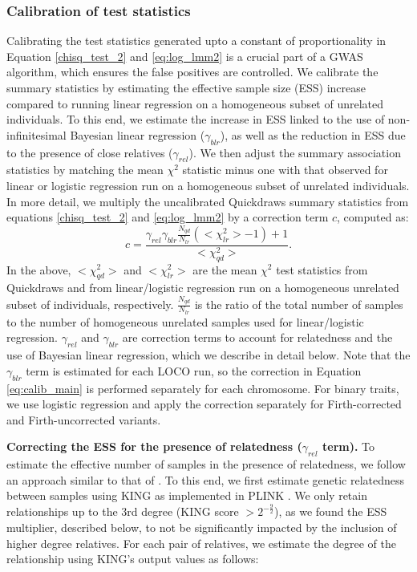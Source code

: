 \subsubsection{Calibration of test statistics}

Calibrating the test statistics generated upto a constant of proportionality in Equation \ref{chisq_test_2} and \ref{eq:log_lmm2} is a crucial part of a GWAS algorithm, which ensures the false positives are controlled.
%
We calibrate the summary statistics by estimating the effective sample size (ESS) increase compared to running linear regression on a homogeneous subset of unrelated individuals.
%
To this end, we estimate the increase in ESS linked to the use of non-infinitesimal Bayesian linear regression ($\gamma_{blr}$), as well as the reduction in ESS due to the presence of close relatives ($\gamma_{rel}$).
%
We then adjust the summary association statistics by matching the mean $\chi^2$ statistic minus one \cite{yang2011genomic} with that observed for linear or logistic regression run on a homogeneous subset of unrelated individuals.
%
In more detail, we multiply the uncalibrated Quickdraws summary statistics from equations \ref{chisq_test_2} and \ref{eq:log_lmm2} by a correction term $c$, computed as:
\begin{equation}
c = \frac{\gamma_{rel}\gamma_{blr}\frac{N_{qd}}{N_{lr}}(<\chi_{lr}^2> - 1) + 1}{<\chi_{qd}^2>}.
\label{eq:calib_main}
\end{equation}
In the above, $<\chi_{qd}^2>$ and $<\chi_{lr}^2>$ are the mean $\chi^2$ test statistics from Quickdraws and from linear/logistic regression run on a homogeneous unrelated subset of individuals, respectively.
%
$\frac{N_{qd}}{N_{lr}}$ is the ratio of the total number of samples to the number of homogeneous unrelated samples used for linear/logistic regression.
%
$\gamma_{rel}$ and $\gamma_{blr}$ are correction terms to account for relatedness and the use of Bayesian linear regression, which we describe in detail below.
%
Note that the $\gamma_{blr}$ term is estimated for each LOCO run, so the correction in Equation \ref{eq:calib_main} is performed separately for each chromosome.
%
For binary traits, we use logistic regression and apply the correction separately for Firth-corrected and Firth-uncorrected variants.

\vspace{2mm}

%
\noindent \textbf{Correcting the ESS for the presence of relatedness ($\gamma_{rel}$ term).} To estimate the effective number of samples in the presence of relatedness, we follow an approach similar to that of \cite{ziyatdinov2021estimating}.
%
To this end, we first estimate genetic relatedness between samples using KING \cite{manichaikul2010robust} as implemented in PLINK \cite{chang2015second}.
%
We only retain relationships up to the 3rd degree (KING score $>2^{-\frac{9}{2}}$), as we found the ESS multiplier, described below, to not be significantly impacted by the inclusion of higher degree relatives.
%
For each pair of relatives, we estimate the degree of the relationship using KING’s output values as follows:

